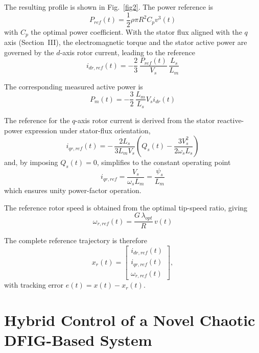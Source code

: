 \documentclass[conference]{IEEEtran}
\begin{document}
The resulting profile is shown in Fig.~\ref{fig2}. The power reference is
\begin{equation}
P_{ref}(t) = \frac{1}{2}\rho\pi R^{2}C_{p}v^{3}(t)
\label{eq12}
\end{equation}
with $C_{p}$ the optimal power coefficient. With the stator flux aligned with the $q$ axis (Section~III), the electromagnetic torque and the stator active power are governed by the $d$-axis rotor current, leading to the reference
\begin{equation}
i_{dr,ref}(t) = -\frac{2}{3}\,\frac{P_{ref}(t)}{V_{s}}\,\frac{L_{s}}{L_{m}}
\label{eq13}
\end{equation}

The corresponding measured active power is
\begin{equation}
P_{m}(t) = -\frac{3}{2}\,\frac{L_{m}}{L_{s}}V_{s}i_{dr}(t)
\label{eq14}
\end{equation}

The reference for the $q$-axis rotor current is derived from the stator reactive-power expression under stator-flux orientation,
\begin{equation}
i_{qr,ref}(t) = - \,\frac{2L_{s}}{3L_{m}V_{s}}\left( Q_{s}(t) - \frac{3V_{s}^{2}}{2\omega_{s}L_{s}} \right)
\label{eq15}
\end{equation}
and, by imposing $Q_{s}(t) = 0$, simplifies to the constant operating point
\begin{equation}
i_{qr,ref} = \frac{V_{s}}{\omega_{s}L_{m}} = \frac{\psi_{s}}{L_{m}}
\label{eq16}
\end{equation}
which ensures unity power-factor operation.

The reference rotor speed is obtained from the optimal tip-speed ratio, giving
\begin{equation}
\omega_{r,ref}(t) = \frac{G\,\lambda_{opt}}{R}\, v(t)
\label{eq17}
\end{equation}

The complete reference trajectory is therefore
\begin{equation*}
x_{r}(t) = \begin{bmatrix}
i_{dr,ref}(t) \\
i_{qr,ref}(t) \\
\omega_{r,ref}(t)
\end{bmatrix},
\end{equation*}
with tracking error $e(t) = x(t) - x_{r}(t)$.

\section{Hybrid Control of a Novel Chaotic DFIG-Based System}
\end{document}
